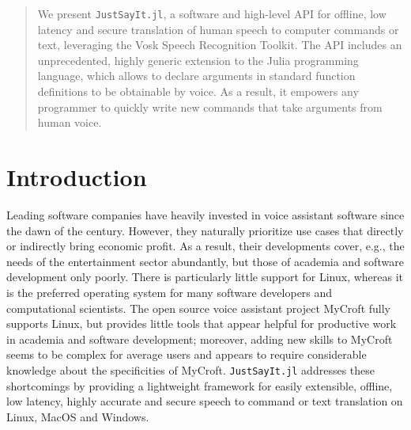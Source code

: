 \documentclass{juliacon}
\begin{document}


\maketitle

\begin{abstract}
We present \texttt{JustSayIt.jl}, a software and high-level API for offline, low latency and secure translation of human speech to computer commands or text, leveraging the Vosk Speech Recognition Toolkit. The API includes an unprecedented, highly generic extension to the Julia programming language, which allows to declare arguments in standard function definitions to be obtainable by voice. As a result, it empowers any programmer to quickly write new commands that take arguments from human voice.
\end{abstract}

\section{Introduction}
Leading software companies have heavily invested in voice assistant software since the dawn of the century. However, they naturally prioritize use cases that directly or indirectly bring economic profit. As a result, their developments cover, e.g., the needs of the entertainment sector abundantly, but those of academia and software development only poorly. There is particularly little support for Linux, whereas it is the preferred operating system for many software developers and computational scientists. The open source voice assistant project MyCroft fully supports Linux, but provides little tools that appear helpful for productive work in academia and software development; moreover, adding new skills to MyCroft seems to be complex for average users and appears to require considerable knowledge about the specificities of MyCroft. \texttt{JustSayIt.jl} addresses these shortcomings by providing a lightweight framework for easily extensible, offline, low latency, highly accurate and secure speech to command or text translation on Linux, MacOS and Windows.
\end{document}
